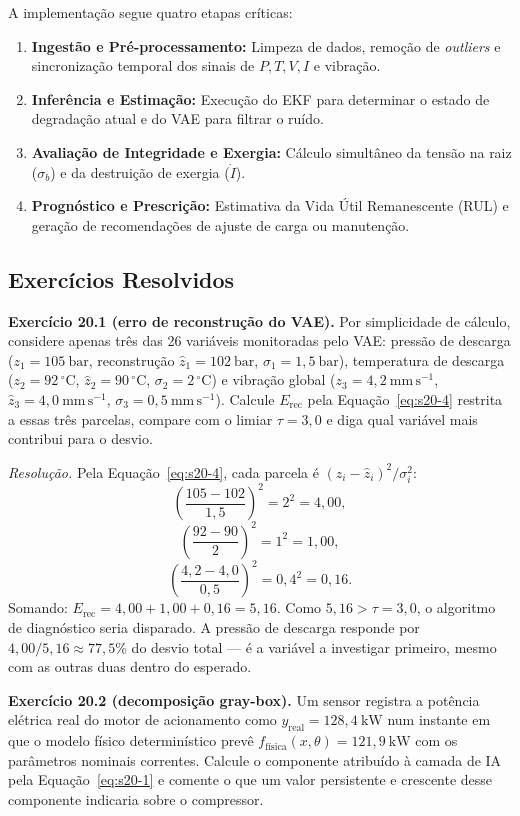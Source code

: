 \documentclass[12pt,a4paper]{article}
\numberwithin{equation}{section}
\numberwithin{table}{section}
\numberwithin{figure}{section}
\begin{document}
{	A implementação segue quatro etapas críticas:
	\begin{enumerate}
		\item \textbf{Ingestão e Pré-processamento:} Limpeza de dados, remoção de \textit{outliers} e sincronização temporal dos sinais de $P, T, V, I$ e vibração.
		\item \textbf{Inferência e Estimação:} Execução do EKF para determinar o estado de degradação atual e do VAE para filtrar o ruído.
		\item \textbf{Avaliação de Integridade e Exergia:} Cálculo simultâneo da tensão na raiz ($\sigma_b$) e da destruição de exergia ($\dot{I}$).
		\item \textbf{Prognóstico e Prescrição:} Estimativa da Vida Útil Remanescente (RUL) e geração de recomendações de ajuste de carga ou manutenção.
	\end{enumerate}

	\subsection{Exercícios Resolvidos}

	\textbf{Exercício 20.1 (erro de reconstrução do VAE).} Por simplicidade
	de cálculo, considere apenas três das 26 variáveis monitoradas pelo
	VAE: pressão de descarga ($z_1=105\ \mathrm{bar}$, reconstrução
	$\hat{z}_1=102\ \mathrm{bar}$, $\sigma_1=1{,}5\ \mathrm{bar}$),
	temperatura de descarga ($z_2=92\,^{\circ}\mathrm{C}$,
	$\hat{z}_2=90\,^{\circ}\mathrm{C}$, $\sigma_2=2\,^{\circ}\mathrm{C}$) e
	vibração global ($z_3=4{,}2\ \mathrm{mm\,s^{-1}}$,
	$\hat{z}_3=4{,}0\ \mathrm{mm\,s^{-1}}$,
	$\sigma_3=0{,}5\ \mathrm{mm\,s^{-1}}$). Calcule $E_{\text{rec}}$ pela
	Equação~\eqref{eq:s20-4} restrita a essas três parcelas, compare com o
	limiar $\tau=3{,}0$ e diga qual variável mais contribui para o desvio.

	\emph{Resolução.} Pela Equação~\eqref{eq:s20-4}, cada parcela é
	$(z_i-\hat{z}_i)^2/\sigma_i^2$:
	$$\left(\frac{105-102}{1{,}5}\right)^2 = 2^2 = 4{,}00,$$
	$$\left(\frac{92-90}{2}\right)^2 = 1^2 = 1{,}00,$$
	$$\left(\frac{4{,}2-4{,}0}{0{,}5}\right)^2 = 0{,}4^2 = 0{,}16.$$
	Somando: $E_{\text{rec}} = 4{,}00+1{,}00+0{,}16 = 5{,}16$. Como
	$5{,}16 > \tau = 3{,}0$, o algoritmo de diagnóstico seria disparado. A
	pressão de descarga responde por $4{,}00/5{,}16 \approx 77{,}5\%$ do
	desvio total --- é a variável a investigar primeiro, mesmo com as
	outras duas dentro do esperado.

	\textbf{Exercício 20.2 (decomposição gray-box).} Um sensor registra a
	potência elétrica real do motor de acionamento como
	$y_{\text{real}} = 128{,}4\ \mathrm{kW}$ num instante em que o modelo
	físico determinístico prevê $f_{\text{física}}(x,\theta) =
	121{,}9\ \mathrm{kW}$ com os parâmetros nominais correntes. Calcule o
	componente atribuído à camada de IA pela Equação~\eqref{eq:s20-1} e
	comente o que um valor persistente e crescente desse componente
	indicaria sobre o compressor.

}
\end{document}
